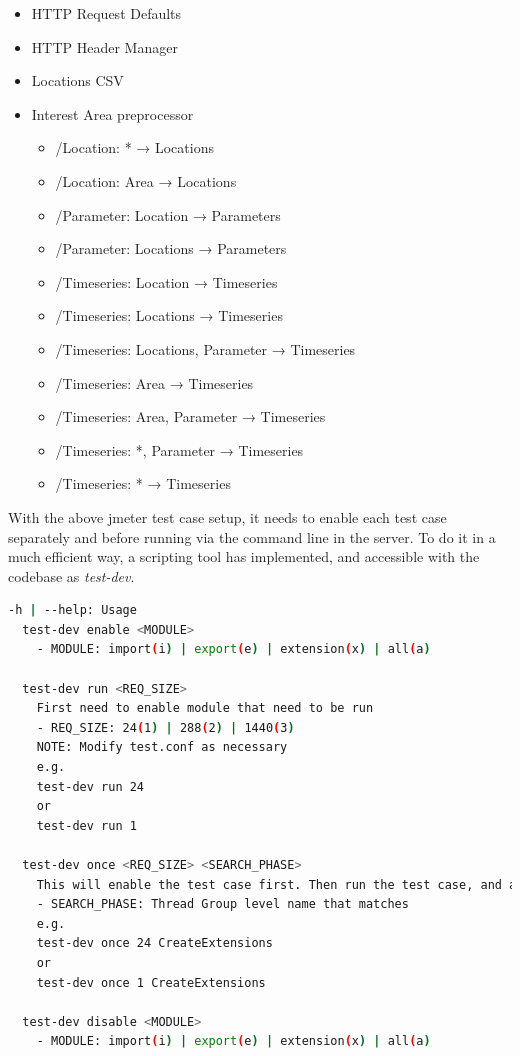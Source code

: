 \begin{itemize}
    \item HTTP Request Defaults
    \item HTTP Header Manager
    \item Locations CSV
    \item Interest Area preprocessor
    \begin{itemize}
        \item /Location: * → Locations
    	\item /Location: Area → Locations
    	\item /Parameter: Location → Parameters
    	\item /Parameter: Locations → Parameters
    	\item /Timeseries: Location → Timeseries
    	\item /Timeseries: Locations → Timeseries
    	\item /Timeseries: Locations, Parameter → Timeseries
    	\item /Timeseries: Area → Timeseries
    	\item /Timeseries: Area, Parameter → Timeseries
    	\item /Timeseries: *, Parameter → Timeseries
    	\item /Timeseries: * → Timeseries
	\end{itemize}
\end{itemize}


With the above \acrshort{jmeter} test case setup, it needs to enable each test case separately and before running via the command line in the server. To do it in a much efficient way, a scripting tool has implemented, and accessible with the codebase \cite{KarunarathneWdias-performance-test/TEST_PLAN.md:Plan} as \emph{test-dev}.

\begin{lstlisting}[language=sh, caption=Performance Test Help]
-h | --help: Usage
  test-dev enable <MODULE>
    - MODULE: import(i) | export(e) | extension(x) | all(a)

  test-dev run <REQ_SIZE>
    First need to enable module that need to be run
    - REQ_SIZE: 24(1) | 288(2) | 1440(3)
    NOTE: Modify test.conf as necessary
    e.g.
    test-dev run 24
    or
    test-dev run 1

  test-dev once <REQ_SIZE> <SEARCH_PHASE>
    This will enable the test case first. Then run the test case, and at the end disable and exit.
    - SEARCH_PHASE: Thread Group level name that matches
    e.g.
    test-dev once 24 CreateExtensions
    or
    test-dev once 1 CreateExtensions

  test-dev disable <MODULE>
    - MODULE: import(i) | export(e) | extension(x) | all(a)
\end{lstlisting}

